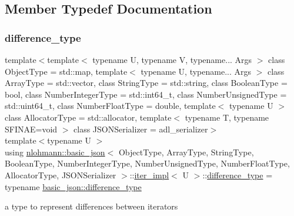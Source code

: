 \subsection{Member Typedef Documentation}
\mbox{\label{classnlohmann_1_1basic__json_1_1iter__impl_aa3d908ee643e5938d32e5f6d261d7715}} 
\subsubsection{\texorpdfstring{difference\+\_\+type}{difference\_type}}
{\footnotesize\ttfamily template$<$template$<$ typename U, typename V, typename... Args $>$ class Object\+Type = std\+::map, template$<$ typename U, typename... Args $>$ class Array\+Type = std\+::vector, class String\+Type  = std\+::string, class Boolean\+Type  = bool, class Number\+Integer\+Type  = std\+::int64\+\_\+t, class Number\+Unsigned\+Type  = std\+::uint64\+\_\+t, class Number\+Float\+Type  = double, template$<$ typename U $>$ class Allocator\+Type = std\+::allocator, template$<$ typename T, typename S\+F\+I\+N\+A\+E=void $>$ class J\+S\+O\+N\+Serializer = adl\+\_\+serializer$>$ \\
template$<$typename U $>$ \\
using \hyperlink{classnlohmann_1_1basic__json}{nlohmann\+::basic\+\_\+json}$<$ Object\+Type, Array\+Type, String\+Type, Boolean\+Type, Number\+Integer\+Type, Number\+Unsigned\+Type, Number\+Float\+Type, Allocator\+Type, J\+S\+O\+N\+Serializer $>$\+::\hyperlink{classnlohmann_1_1basic__json_1_1iter__impl}{iter\+\_\+impl}$<$ U $>$\+::\hyperlink{classnlohmann_1_1basic__json_1_1iter__impl_aa3d908ee643e5938d32e5f6d261d7715}{difference\+\_\+type} =  typename \hyperlink{classnlohmann_1_1basic__json_afe7c1303357e19cea9527af4e9a31d8f}{basic\+\_\+json\+::difference\+\_\+type}}



a type to represent differences between iterators 

\mbox{\label{classnlohmann_1_1basic__json_1_1iter__impl_adbe1b700b9cdc38f6991fc68683a9c2c}} 
